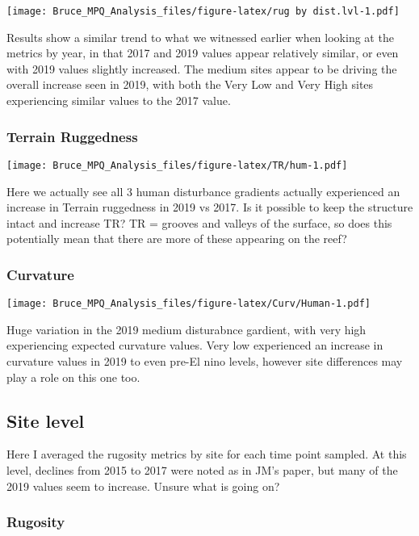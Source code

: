 \documentclass[]{article}
\begin{document}
\texttt{[image: Bruce\_MPQ\_Analysis\_files/figure-latex/rug by dist.lvl-1.pdf]}

Results show a similar trend to what we witnessed earlier when looking
at the metrics by year, in that 2017 and 2019 values appear relatively
similar, or even with 2019 values slightly increased. The medium sites
appear to be driving the overall increase seen in 2019, with both the
Very Low and Very High sites experiencing similar values to the 2017
value.

\hypertarget{terrain-ruggedness-1}{%
\subsubsection{Terrain Ruggedness}\label{terrain-ruggedness-1}}

\texttt{[image: Bruce\_MPQ\_Analysis\_files/figure-latex/TR/hum-1.pdf]}

Here we actually see all 3 human disturbance gradients actually
experienced an increase in Terrain ruggedness in 2019 vs 2017. Is it
possible to keep the structure intact and increase TR? TR = grooves and
valleys of the surface, so does this potentially mean that there are
more of these appearing on the reef?

\hypertarget{curvature-1}{%
\subsubsection{Curvature}\label{curvature-1}}

\texttt{[image: Bruce\_MPQ\_Analysis\_files/figure-latex/Curv/Human-1.pdf]}

Huge variation in the 2019 medium disturabnce gardient, with very high
experiencing expected curvature values. Very low experienced an increase
in curvature values in 2019 to even pre-El nino levels, however site
differences may play a role on this one too.

\hypertarget{site-level}{%
\subsection{Site level}\label{site-level}}

Here I averaged the rugosity metrics by site for each time point
sampled. At this level, declines from 2015 to 2017 were noted as in JM's
paper, but many of the 2019 values seem to increase. Unsure what is
going on?

\hypertarget{rugosity-2}{%
\subsubsection{Rugosity}\label{rugosity-2}}
\end{document}
